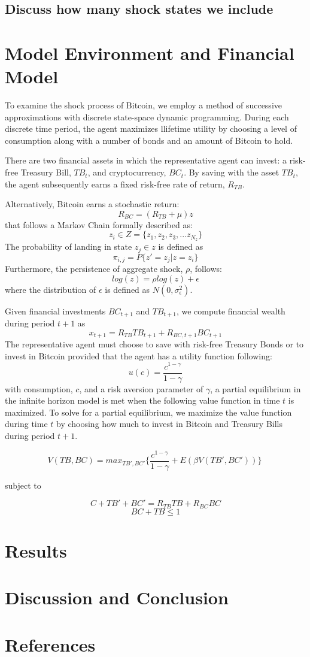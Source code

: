 \documentclass[]{article}
\begin{document}
\subsection{Discuss how many shock states we
include}\label{discuss-how-many-shock-states-we-include}

\section{Model Environment and Financial
Model}\label{model-environment-and-financial-model}

To examine the shock process of Bitcoin, we employ a method of
successive approximations with discrete state-space dynamic programming.
During each discrete time period, the agent maximizes llifetime utility
by choosing a level of consumption along with a number of bonds and an
amount of Bitcoin to hold.

There are two financial assets in which the representative agent can
invest: a risk-free Treasury Bill, \(TB_t\), and cryptocurrency,
\(BC_t\). By saving with the asset \(TB_t\), the agent subsequently
earns a fixed risk-free rate of return, \(R_{TB}\).

Alternatively, Bitcoin earns a stochastic return:
\[R_{BC} = (R_{TB} + \mu)z\] that follows a Markov Chain formally
described as: \[z_i \in  Z = \{z_1, z_2, z_3, ... z_{N_z}\}\] The
probability of landing in state \(z_j \in z\) is defined as
\[\pi_{i,j} = P\{z' = z_j | z = z_i\}\] Furthermore, the persistence of
aggregate shock, \(\rho\), follows: \[log(z) = \rho log(z) + \epsilon\]
where the distribution of \(\epsilon\) is defined as
\(N(0, \sigma_\epsilon^2)\).

Given financial investments \(BC_{t+1}\) and \(TB_{t+1}\), we compute
financial wealth during period \(t + 1\) as
\[x_{t+1} = R_{TB}TB_{t+1} + R_{BC, t + 1} BC_{t+1}\] The representative
agent must choose to save with risk-free Treasury Bonds or to invest in
Bitcoin provided that the agent has a utility function following:
\[u(c) = \frac{c^{1-\gamma}}{1 - \gamma}\] with consumption, \(c\), and
a risk aversion parameter of \(\gamma\), a partial equilibrium in the
infinite horizon model is met when the following value function in time
\(t\) is maximized. To solve for a partial equilibrium, we maximize the
value function during time \(t\) by choosing how much to invest in
Bitcoin and Treasury Bills during period \(t+1\).

\[V (TB, BC) = max_{TB',BC'} \{\frac{c^{1-\gamma}}{1 - \gamma} + E(\beta V(TB', BC')) \}\ \]

subject to

\[C + TB' + BC' = R_{TB}TB + R_{BC}BC\] \[BC + TB \leq 1\]

\section{Results}\label{results}

\section{Discussion and Conclusion}\label{discussion-and-conclusion}

\section{References}\label{references}
\end{document}
